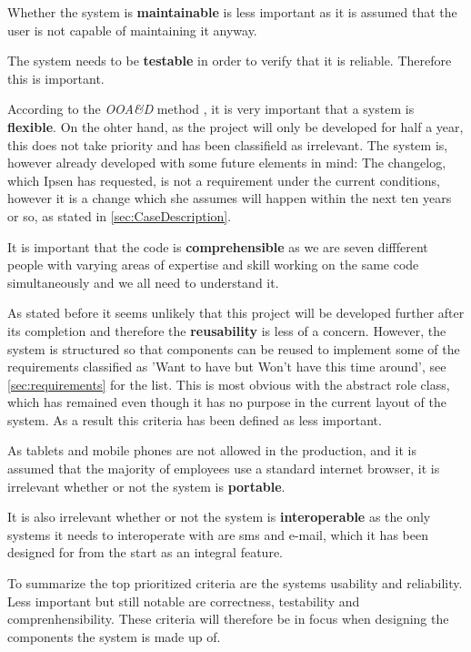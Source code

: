\documentclass[../../master.tex]{subfiles}
\begin{document}
Whether the system is \textbf{maintainable} is less important as it is assumed that the user is not capable of maintaining it anyway.

The system needs to be \textbf{testable} in order to verify that it is reliable.
Therefore this is important.

According to the \textit{OOA\&D} method \citep[p.~182]{Rod-Aalborg}, it is very important that a system is \textbf{flexible}.
On the ohter hand, as the project will only be developed for half a year, this does not take priority and has been classifield as irrelevant.
The system is, however already developed with some future elements in mind: The changelog, which Ipsen has requested, is not a requirement under the current conditions, however it is a change which she assumes will happen within the next ten years or so, as stated in \cref{sec:CaseDescription}.

It is important that the code is \textbf{comprehensible} as we are seven diffferent people with varying areas of expertise and skill working on the same code simultaneously and we all need to understand it.

As stated before it seems unlikely that this project will be developed further after its completion and therefore the \textbf{reusability} is less of a concern.
However, the system is structured so that components can be reused to implement some of the requirements classified as 'Want to have but Won't have this time around', see \cref{sec:requirements} for the list.
This is most obvious with the abstract role class, which has remained even though it has no purpose in the current layout of the system.
As a result this criteria has been defined as less important.

As tablets and mobile phones are not allowed in the production, and it is assumed that the majority of employees use a standard internet browser, it is irrelevant whether or not the system is \textbf{portable}.

It is also irrelevant whether or not the system is \textbf{interoperable} as the only systems it needs to interoperate with are sms and e-mail, which it has been designed for from the start as an integral feature.

To summarize the top prioritized criteria are the systems usability and reliability.
Less important but still notable are correctness, testability and comprenhensibility.
These criteria will therefore be in focus when designing the components the system is made up of.
\end{document}
